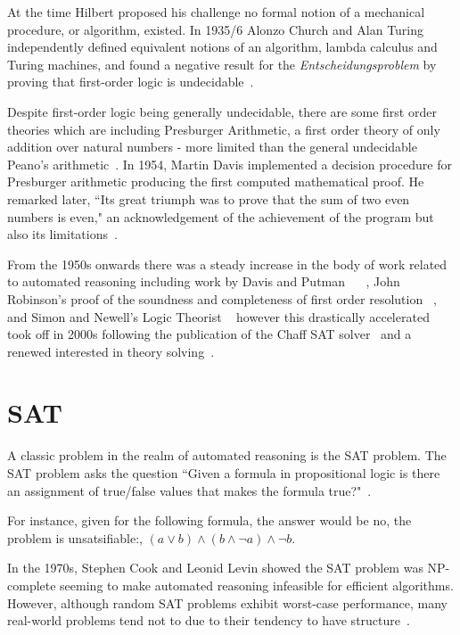 \documentclass[]{final_report}
\begin{document}
At the time Hilbert proposed his challenge no formal notion of a mechanical procedure, or algorithm, existed. In 1935/6 Alonzo Church and Alan Turing independently defined equivalent notions of an algorithm, lambda calculus and Turing machines, and found a negative result for the \textit{Entscheidungsproblem} by proving that first-order logic is undecidable~\cite{turingchurchproof}.

Despite first-order logic being generally undecidable, there are some first order theories which are including Presburger Arithmetic, a first order theory of only addition over natural numbers - more limited than the general undecidable Peano's arithmetic~\cite{automatedreasoningbooklet2004}. In 1954, Martin Davis implemented a decision procedure for Presburger arithmetic producing the first computed mathematical proof. He remarked later, ``Its great triumph was to prove that the sum of two even numbers is even," an acknowledgement of the achievement of the program but also its limitations~\cite{excapebarrettriseofsmt, automatedreasoningbooklet2004}.

From the 1950s onwards there was a steady increase in the body of work related to automated reasoning including work by Davis and Putman ~\cite{Davis:1960:CPQ:321033.321034} ~\cite{Davis:1962:MPT:368273.368557}, John Robinson's proof of the soundness and completeness of first order resolution ~\cite{robinson1965machine}, and Simon and Newell's Logic Theorist ~\cite{newell1956logic} however this drastically accelerated took off in 2000s following the publication of the Chaff SAT solver~\cite{moskewicz2001chaff} and a renewed interested in theory solving~\cite{excapebarrettriseofsmt}.

\section{SAT}
A classic problem in the realm of automated reasoning is the SAT problem. The SAT problem asks the question ``Given a formula in propositional logic is there an assignment of true/false values that makes the formula true?"~\cite{smtwheredowegofromhere}.

For instance, given for the following formula, the answer would be no, the problem is unsatsifiable:, $(a \lor b) \land (b \land \lnot a) \land \lnot b $.

In the 1970s, Stephen Cook and Leonid Levin showed the SAT problem was NP-complete seeming to make automated reasoning infeasible for efficient algorithms. However, although random SAT problems exhibit worst-case performance, many real-world problems tend not to due to their tendency to have structure~\cite{smtwheredowegofromhere}.
\end{document}
